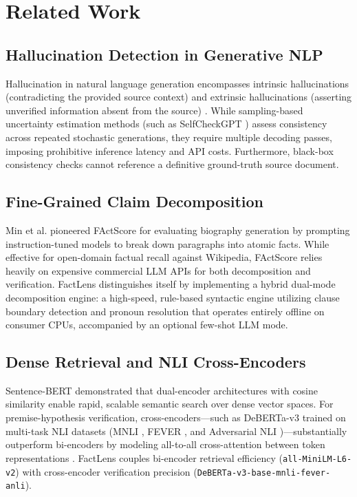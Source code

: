 \documentclass[conference]{IEEEtran}
\begin{document}
\section{Related Work}
\subsection{Hallucination Detection in Generative NLP}
Hallucination in natural language generation encompasses intrinsic hallucinations (contradicting the provided source context) and extrinsic hallucinations (asserting unverified information absent from the source) \cite{ji2023survey}. While sampling-based uncertainty estimation methods (such as SelfCheckGPT \cite{manakul2023selfcheckgpt}) assess consistency across repeated stochastic generations, they require multiple decoding passes, imposing prohibitive inference latency and API costs. Furthermore, black-box consistency checks cannot reference a definitive ground-truth source document.

\subsection{Fine-Grained Claim Decomposition}
Min et al. \cite{min2023factscore} pioneered FActScore for evaluating biography generation by prompting instruction-tuned models to break down paragraphs into atomic facts. While effective for open-domain factual recall against Wikipedia, FActScore relies heavily on expensive commercial LLM APIs for both decomposition and verification. FactLens distinguishes itself by implementing a hybrid dual-mode decomposition engine: a high-speed, rule-based syntactic engine utilizing clause boundary detection and pronoun resolution that operates entirely offline on consumer CPUs, accompanied by an optional few-shot LLM mode.

\subsection{Dense Retrieval and NLI Cross-Encoders}
Sentence-BERT \cite{reimers2019sentence} demonstrated that dual-encoder architectures with cosine similarity enable rapid, scalable semantic search over dense vector spaces. For premise-hypothesis verification, cross-encoders—such as DeBERTa-v3 \cite{he2021deberta} trained on multi-task NLI datasets (MNLI \cite{williams2018broad}, FEVER \cite{thorne2018fever}, and Adversarial NLI \cite{nie2020adversarial})—substantially outperform bi-encoders by modeling all-to-all cross-attention between token representations \cite{laurer2022less}. FactLens couples bi-encoder retrieval efficiency (\texttt{all-MiniLM-L6-v2}) with cross-encoder verification precision (\texttt{DeBERTa-v3-base-mnli-fever-anli}).
\end{document}
